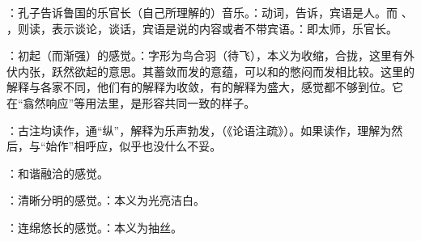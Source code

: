 {
\item {}：孔子告诉鲁国的乐官长（自己所理解的）音乐。：动词，告诉，宾语是人。而  、 ，则读，表示谈论，谈话，宾语是说的内容或者不带宾语。：即太师，乐官长。
\item {}：初起（而渐强）的感觉。：字形为鸟合羽（待飞），本义为收缩，合拢，这里有外伏内张，跃然欲起的意思。其蓄敛而发的意蕴，可以和的憋闷而发相比较。这里的解释与各家不同，他们有的解释为收敛，有的解释为盛大，感觉都不够到位。它在“翕然响应”等用法里，是形容共同一致的样子。
\item {}：古注均读作，通“纵”，解释为乐声勃发，（《论语注疏》）。如果读作，理解为然后，与“始作”相呼应，似乎也没什么不妥。
\item {}：和谐融洽的感觉。
\item {}：清晰分明的感觉。：本义为光亮洁白。
\item {}：连绵悠长的感觉。：本义为抽丝。
}
{}


